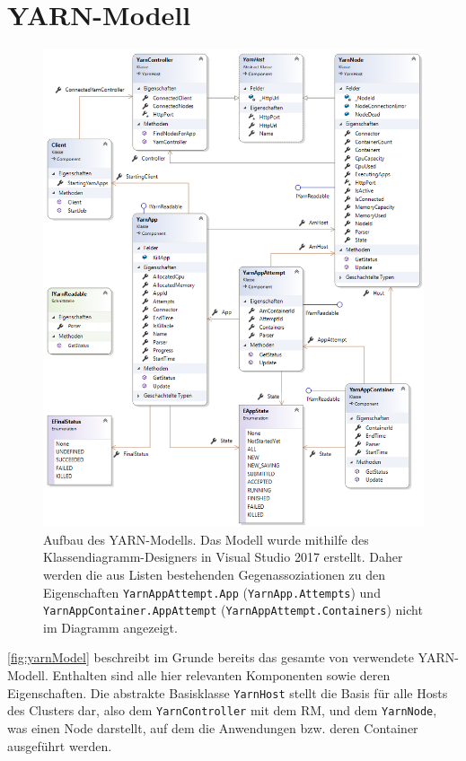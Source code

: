 \section{YARN-Modell}\label{sec:yarnModel}

\begin{figure}
	\centering
	\includegraphics[width=\columnwidth]{./images/yarnModel.png}
	\caption[Aufbau des YARN-Modells]{Aufbau des YARN-Modells. Das Modell wurde mithilfe des Klassendiagramm-Designers in Visual Studio 2017 erstellt. Daher werden die aus Listen bestehenden Gegenassoziationen zu den Eigenschaften \texttt{YarnAppAttempt.App} (\texttt{YarnApp.Attempts}) und \texttt{YarnAppContainer.AppAttempt} (\texttt{YarnAppAttempt.Containers}) nicht im Diagramm angezeigt.}
	\label{fig:yarnModel}
\end{figure}

\autoref{fig:yarnModel} beschreibt im Grunde bereits das gesamte von \sS verwendete YARN-Modell. Enthalten sind alle hier relevanten Komponenten sowie deren Eigenschaften. Die abstrakte Basisklasse \texttt{YarnHost} stellt die Basis für alle Hosts des Clusters dar, also dem \texttt{YarnController} mit dem \ac{RM}, und dem \texttt{YarnNode}, was einen Node darstellt, auf dem die Anwendungen bzw. deren Container ausgeführt werden.